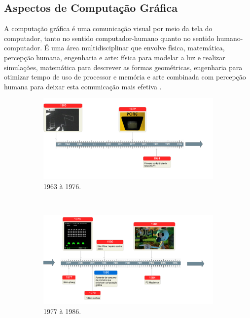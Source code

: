 \subsection{Aspectos de Computação Gráfica}

A computação gráfica é uma comunicação visual por meio da tela do computador, tanto no sentido computador-humano quanto no sentido humano-computador. É uma área multidisciplinar que envolve física, matemática, percepção humana, engenharia e arte: física para modelar a luz e realizar simulações, matemática para descrever as formas geométricas, engenharia para otimizar tempo de uso de processor e memória e arte combinada com percepção humana para deixar esta comunicação mais efetiva \cite{cgintro}.

\begin{figure}
  \centering
  \begin{subfigure}[t]{.8\textwidth}
    \includegraphics[scale=0.4]{img/timeline1}
    \caption{1963 à 1976.} 
  \end{subfigure}
  ~
  \begin{subfigure}[t]{.8\textwidth}
    \includegraphics[scale=0.4]{img/timeline2}
    \caption{1977 à 1986.} 
  \end{subfigure}
  ~
  \begin{subfigure}[t]{.8\textwidth}

\end{subfigure}
\end{figure}
